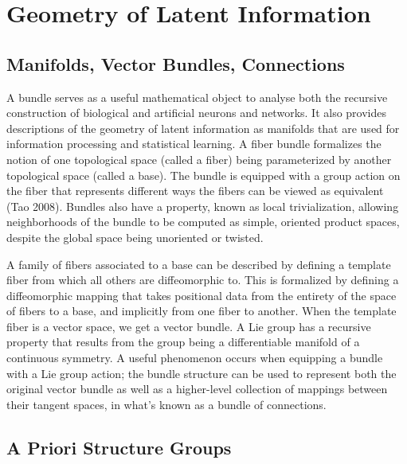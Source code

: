 \documentclass{article}
\begin{document}

\section{Geometry of Latent Information}

\subsection{Manifolds, Vector Bundles, Connections}
    A bundle serves as a useful mathematical object to analyse both the recursive construction of biological and artificial neurons and networks. It also provides descriptions of the geometry of latent information as manifolds that  are used for information processing and statistical learning.
    A fiber bundle formalizes the notion of one topological space (called a fiber) being parameterized by another topological space (called a base). The bundle is equipped with a group action on the fiber that represents different ways the fibers can be viewed as equivalent (Tao 2008). Bundles also have a property, known as local trivialization, allowing neighborhoods of the bundle to be computed as simple, oriented product spaces, despite the global space being unoriented or twisted.
    
    A family of fibers associated to a base can be described by defining a template fiber from which all others are diffeomorphic to. This is formalized by defining a diffeomorphic mapping that takes positional data from the entirety of the space of fibers to a base, and implicitly from one fiber to another. When the template fiber is a vector space, we get a vector bundle. 
    A Lie group has a recursive property that results from the group being a differentiable manifold of a continuous symmetry. A useful phenomenon occurs when equipping a bundle with a Lie group action; the bundle structure can be used to represent both the original vector bundle as well as a higher-level collection of mappings between their tangent spaces, in what's known as a bundle of connections. 
    

\subsection{A Priori Structure Groups}
    
\end{document}

